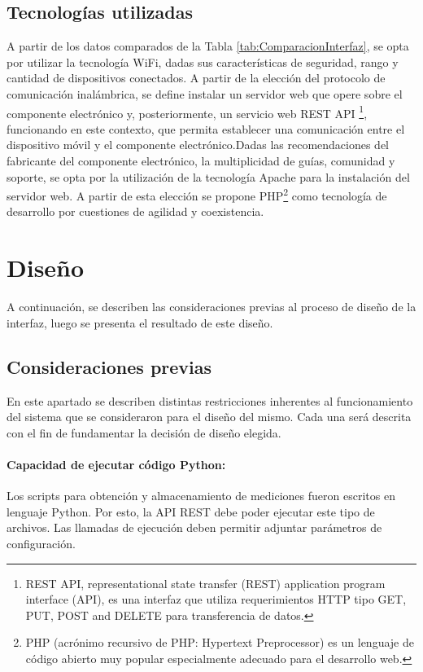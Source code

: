         \subsection{Tecnologías utilizadas}
            A partir de los datos comparados de la Tabla \ref{tab:ComparacionInterfaz}, se opta por utilizar la tecnología WiFi, dadas sus características de seguridad, rango y cantidad de dispositivos conectados. A partir de la elección del protocolo de comunicación inalámbrica, se define instalar un servidor web que opere sobre el componente electrónico y, posteriormente, un servicio web REST API \footnote{REST API, representational state transfer (REST) application program interface (API), es una interfaz que utiliza requerimientos HTTP tipo GET, PUT, POST and DELETE para transferencia de datos.}, funcionando en este contexto, que permita establecer una comunicación entre el dispositivo móvil y el componente electrónico.Dadas las recomendaciones del fabricante del componente electrónico, la multiplicidad de guías, comunidad y soporte, se opta por la utilización de la tecnología Apache para la instalación del servidor web. A partir de esta elección se propone PHP\footnote{PHP (acrónimo recursivo de PHP: Hypertext Preprocessor) es un lenguaje de código abierto muy popular especialmente adecuado para el desarrollo web.} como tecnología de desarrollo por cuestiones de agilidad y coexistencia.
            
    \section{Diseño}
    A continuación, se describen las consideraciones previas al proceso de diseño de la interfaz, luego se presenta el resultado de este diseño.
        
        \subsection{Consideraciones previas}
            \par En este apartado se describen distintas restricciones inherentes al funcionamiento del sistema que se consideraron para el diseño del mismo. Cada una será descrita con el fin de fundamentar la decisión de diseño elegida.

            \paragraph{Capacidad de ejecutar código Python:}
                \par Los scripts para obtención y almacenamiento de mediciones fueron escritos en lenguaje Python. Por esto, la API REST debe poder ejecutar este tipo de archivos. Las llamadas de ejecución deben permitir adjuntar parámetros de configuración.
        
